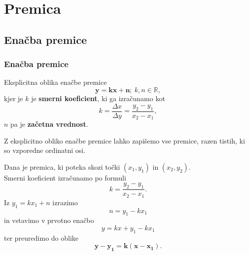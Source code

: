 \section{Premica}

\begin{frame}
    \sectionpage
\end{frame}

\begin{frame}
\end{frame}
        


    \subsection{Enačba premice}

        \begin{frame}
            \frametitle{Enačba premice}

            \begin{alertblock}{Eksplicitna oblika enačbe premice}
                $$ \mathbf{y=kx+n};~ k,n\in\mathbb{R},$$
                kjer je $k$ je \textbf{smerni koeficient}, ki ga izračunamo kot $$k=\dfrac{\Delta x}{\Delta y}=\dfrac{y_2-y_1}{x_2-x_1},$$                
                $n$ pa je \textbf{začetna vrednost}.
            \end{alertblock}

            \begin{block}{}
                Z eksplicitno obliko enačbe premice lahko zapišemo vse premice, razen tistih, ki so vzporedne ordinatni osi.
            \end{block}
        \end{frame}

        \begin{frame}
            \begin{block}{}
                Dana je premica, ki poteka skozi točki $(x_1,y_1)$ in $(x_2,y_2)$. \\
                Smerni koeficient izračunamo po formuli $$k=\dfrac{y_2-y_1}{x_2-x_1}.$$
                Iz $y_1=kx_1+n$ izrazimo $$n=y_1-kx_1$$
                in vstavimo v prvotno enačbo $$y=kx+y_1-kx_1$$
                ter preuredimo do oblike $$\mathbf{y-y_1=k(x-x_1)}.$$
            \end{block}
        \end{frame}


